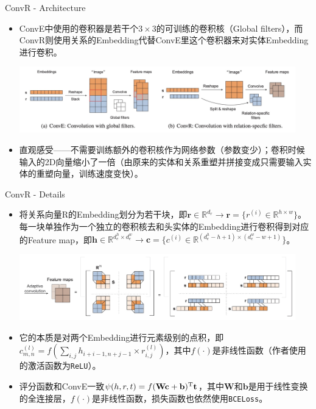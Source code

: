 \begin{frame}[c]{ConvR - Architecture}
    
\begin{itemize}
    \item ConvE中使用的卷积器是若干个$3\times 3$的可训练的卷积核（Global filters），而ConvR则使用关系的Embedding代替ConvE里这个卷积器来对实体Embedding进行卷积。\\
    \begin{center}
        \includegraphics[width=12cm]{assets/3.png}
    \end{center}
    \item 直观感受——不需要训练额外的卷积核作为网络参数（参数变少）；卷积时候输入的2D向量缩小了一倍（由原来的实体和关系重塑并拼接变成只需要输入实体的重塑向量，训练速度变快）。
\end{itemize}
    
\end{frame}

\begin{frame}[c]{ConvR - Details}

\begin{itemize}
    \item 将关系向量R的Embedding划分为若干块，即$\bm{r}\in \mathbb{R}^{d_r}\to \bm{r}=\{r^{(i)}\in \mathbb{R}^{h\times w}\}$。每一块单独作为一个独立的卷积核去和头实体的Embedding进行卷积得到对应的Feature map，即$\bm{h}\in \mathbb{R}^{d_e^h\times d_e^w} \to \bm{c}=\{c^{(i)}\in \mathbb{R}^{(d_e^h-h+1)\times (d_e^w-w+1)}\}$。\\
    \begin{center}
        \includegraphics[width=12cm]{assets/4.png}
    \end{center}
    \item 它的本质是对两个Embedding进行元素级别的点积，即$c_{m,n}^{(l)}=f(\sum\limits_{i,j}h_{i+i-1,n+j-1}\times r_{i,j}^{(l)})$，其中$f(\cdot)$是非线性函数（作者使用的激活函数为\texttt{ReLU}）。
    \item 评分函数和ConvE一致$\psi (h,r,t)=f(\mathbf{Wc+b})^{\rm T}\mathbf{t}$，其中$\mathbf{W}$和$\mathbf{b}$是用于线性变换的全连接层，$f(\cdot)$是非线性函数，损失函数也依然使用\texttt{BCELoss}。
\end{itemize}
    
\end{frame}

